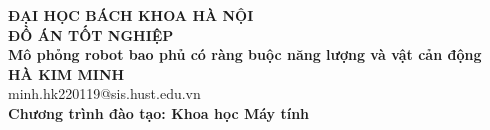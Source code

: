 \documentclass[DoAn.tex]{subfiles}
\begin{document}
\begin{titlepage}
\thispagestyle{empty}
\begin{center}

{\textbf{\large{ĐẠI HỌC BÁCH KHOA HÀ NỘI}}}\\[3cm]

{\textbf{\huge{ ĐỒ ÁN TỐT NGHIỆP}}}\\[1cm]
{\textbf{\Large{Mô phỏng robot bao phủ có ràng buộc năng lượng và vật cản động}}}\\[1cm]

{\textbf{\large{HÀ KIM MINH}}}\\
{\large{minh.hk220119@sis.hust.edu.vn}}\\[0.5cm]

{\textbf{\large{Chương trình đào tạo: Khoa học Máy tính}}}%

\vspace{2cm}
\begin{table}[H]
\centering
{}
\end{table}
\end{center}



\end{titlepage}
\end{document}
